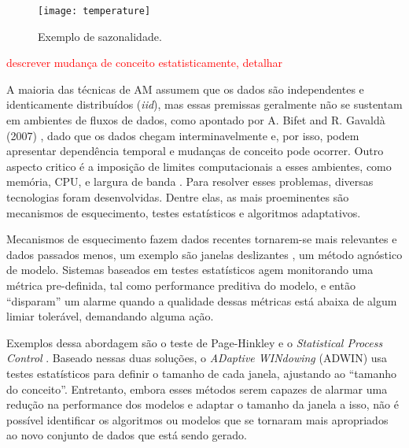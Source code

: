 \begin{figure}[ht]
    \centering
    \texttt{[image: temperature]}
    \caption{Exemplo de sazonalidade.}
    \label{fig:seasonality}
\end{figure}



\textcolor{red}{descrever mudança de conceito estatisticamente, detalhar}




A maioria das técnicas de AM assumem que os dados são independentes e identicamente distribuídos (\textit{iid}),
mas essas premissas geralmente não se sustentam em ambientes de fluxos de dados, como apontado por A. Bifet and R. Gavald\`a (2007) \cite{bifet2007learning},
dado que os dados chegam interminavelmente e, por isso, podem apresentar dependência temporal e mudanças de conceito pode ocorrer.
Outro aspecto critico é a imposição de limites computacionais a esses ambientes, como memória, CPU, e largura de banda \cite{bifet2010moa, gama2012survey}.
Para resolver esses problemas, diversas tecnologias foram desenvolvidas. Dentre elas, as mais proeminentes são mecanismos de esquecimento, testes estatísticos e algoritmos adaptativos.

Mecanismos de esquecimento fazem dados recentes tornarem-se mais relevantes e dados passados menos, um exemplo são janelas deslizantes \cite{gaber2005mining}, um método agnóstico de modelo. 
Sistemas baseados em testes estatísticos agem monitorando uma métrica pre-definida, tal como performance preditiva do modelo, e então ``disparam'' um alarme quando a qualidade dessas métricas está abaixa de algum limiar tolerável, demandando alguma ação.

Exemplos dessa abordagem são o teste de Page-Hinkley e o \textit{Statistical Process Control} \cite{gama2010knowledge}.
Baseado nessas duas soluções, o \textit{ADaptive WINdowing} (ADWIN) \cite{bifet2007learning} usa testes estatísticos para definir o tamanho de cada janela, ajustando ao ``tamanho do conceito''.
Entretanto, embora esses métodos serem capazes de alarmar uma redução na performance dos modelos e adaptar o tamanho da janela a isso, não é possível identificar os algoritmos ou modelos que se tornaram mais apropriados ao novo conjunto de dados que está sendo gerado.

